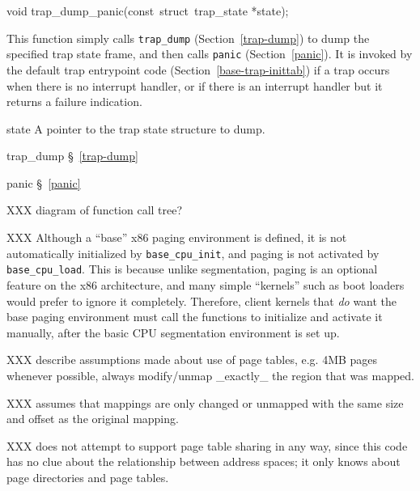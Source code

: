 \label{trap-dump-panic}
\begin{apisyn}

	\funcproto void trap_dump_panic(const~struct~trap_state *state);
\end{apisyn}
\begin{apidesc}
	This function simply calls {\tt trap_dump} (Section~\ref{trap-dump})
	to dump the specified trap state frame,
	and then calls {\tt panic} (Section~\ref{panic}).
	It is invoked by the default trap entrypoint code
	(Section~\ref{base-trap-inittab})
	if a trap occurs when there is no interrupt handler,
	or if there is an interrupt handler but it returns a failure indication.
\end{apidesc}
\begin{apiparm}
	\item[state]
		A pointer to the trap state structure to dump.
\end{apiparm}
\begin{apidep}
	\item[trap_dump]		\S~\ref{trap-dump}
	\item[panic]			\S~\ref{panic}
\end{apidep}

\label{kern-x86-base-paging}

XXX diagram of function call tree?

	XXX Although a ``base'' x86 paging environment is defined,
	it is not automatically initialized by {\tt base_cpu_init},
	and paging is not activated by {\tt base_cpu_load}.
	This is because unlike segmentation,
	paging is an optional feature on the x86 architecture,
	and many simple ``kernels'' such as boot loaders
	would prefer to ignore it completely.
	Therefore, client kernels that \emph{do} want the base paging environment
	must call the functions to initialize and activate it manually,
	after the basic CPU segmentation environment is set up.

	XXX describe assumptions made about use of page tables,
	e.g. 4MB pages whenever possible,
	always modify/unmap _exactly_ the region that was mapped.

XXX assumes that mappings are only changed or unmapped
with the same size and offset as the original mapping.

XXX does not attempt to support page table sharing in any way,
since this code has no clue about the relationship between address spaces;
it only knows about page directories and page tables.

